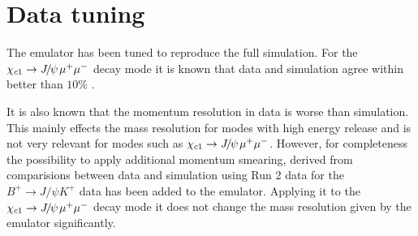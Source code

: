 \section{Data tuning}
\label{sec:data}
%
The emulator has been tuned to reproduce the full simulation. For the
${\chi_{{c} 1}} \rightarrow {\ensuremath{{J\mskip -3mu/\mskip -2mu\psi\mskip 2mu}}} \mu^+ \mu^-$ decay mode it is known that 
data and simulation agree within better than $10 \%$ \cite{Anderlini:2270922}. 

 It is also known that the momentum resolution
in data is worse than simulation. This mainly effects the mass resolution for
modes with high energy release and is not very relevant for modes such
as ${\chi_{{c} 1}} \rightarrow {\ensuremath{{J\mskip -3mu/\mskip -2mu\psi\mskip 2mu}}} \mu^+ \mu^-$. However, for completeness the
possibility to apply additional momentum smearing, derived from
comparisions between data and simulation using Run 2 data for the $B^+
\rightarrow J/\psi K^+$ data has been added to the emulator. Applying
it to the ${\chi_{{c} 1}} \rightarrow {\ensuremath{{J\mskip -3mu/\mskip -2mu\psi\mskip 2mu}}} \mu^+ \mu^-$ decay mode it does not change
the mass resolution given by the emulator significantly.